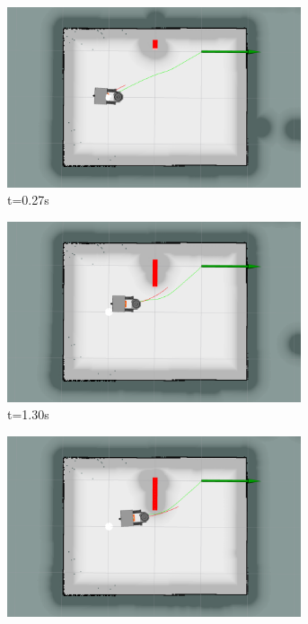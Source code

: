 \begin{figure}[ht]
    \centering
    \begin{subfigure}[b]{0.30\linewidth}
        \centering
        \includegraphics[width=0.95\textwidth]{images/dwa_single_1_obs/1/5027.png}
        \caption{t=0.27s}
    \end{subfigure}%
    \begin{subfigure}[b]{0.30\linewidth}
        \centering
        \includegraphics[width=0.95\textwidth]{images/dwa_single_1_obs/1/5130.png}
        \caption{t=1.30s}
    \end{subfigure}%
    \begin{subfigure}[b]{0.30\linewidth}
        \centering
        \includegraphics[width=0.95\textwidth]{images/dwa_single_1_obs/1/5167.png}

\end{subfigure}
\end{figure}
